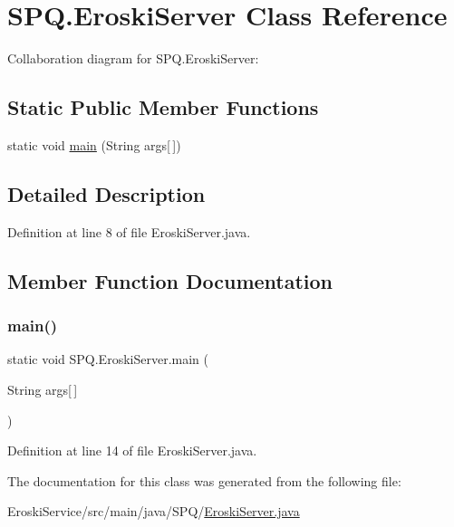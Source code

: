 \hypertarget{class_s_p_q_1_1_eroski_server}{}\section{S\+P\+Q.\+Eroski\+Server Class Reference}
\label{class_s_p_q_1_1_eroski_server}


Collaboration diagram for S\+P\+Q.\+Eroski\+Server\+:
\subsection*{Static Public Member Functions}
\begin{DoxyCompactItemize}
\item 
static void \mbox{\hyperlink{class_s_p_q_1_1_eroski_server_abd0f9fcb4551a071324e502582e46425}{main}} (String args\mbox{[}$\,$\mbox{]})
\end{DoxyCompactItemize}


\subsection{Detailed Description}


Definition at line 8 of file Eroski\+Server.\+java.



\subsection{Member Function Documentation}
\mbox{\label{class_s_p_q_1_1_eroski_server_abd0f9fcb4551a071324e502582e46425}} 
\subsubsection{\texorpdfstring{main()}{main()}}
{\footnotesize\ttfamily static void S\+P\+Q.\+Eroski\+Server.\+main (\begin{DoxyParamCaption}\item[{String}]{args\mbox{[}$\,$\mbox{]} }\end{DoxyParamCaption})\hspace{0.3cm}{\ttfamily [static]}}



Definition at line 14 of file Eroski\+Server.\+java.



The documentation for this class was generated from the following file\+:\begin{DoxyCompactItemize}
\item 
Eroski\+Service/src/main/java/\+S\+P\+Q/\mbox{\hyperlink{_eroski_server_8java}{Eroski\+Server.\+java}}\end{DoxyCompactItemize}
